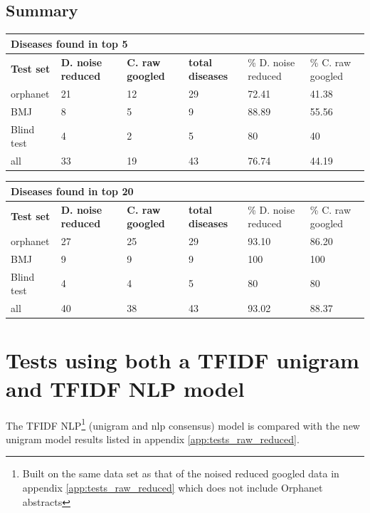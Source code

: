 \documentclass[10pt,letterpaper,two column,final]{article}
\begin{document}
\subsection{Summary}
\label{app:summary_raw_reduced}

\begin{center}
\begin{small}
\begin{tabular}{l|p{2.2cm}p{2.2cm}||p{1.2cm}p{2.2cm}p{2.2cm}}
	\multicolumn{6}{l}{\textbf{Diseases found in top 5}} \\ \hline
\textbf{Test set} & \textbf{D. noise reduced} &	\textbf{C. raw googled}	 &	\textbf{total diseases} &	\% D. noise reduced	 &\% C. raw googled \\ \hline
orphanet    &    21   &  12    & 29      & 72.41     & 41.38 \\
BMJ	        &    8   &   5   &    9   &  88.89    & 55.56 \\
Blind test	&   4    &   2   &    5   &   80   & 40 \\ \hline \hline
all	        &   33    &   19   &   43    &  76.74    & 44.19 \\ \hline
\end{tabular}
\end{small}
\end{center}

\begin{center}
\begin{small}
\begin{tabular}{l|p{2.2cm}p{2.2cm}||p{1.2cm}p{2.2cm}p{2.2cm}}
	\multicolumn{6}{l}{\textbf{Diseases found in top 20}} \\ \hline
\textbf{Test set} & \textbf{D. noise reduced} &	\textbf{C. raw googled}	 &	\textbf{total diseases} &	\% D. noise reduced	 &\% C. raw googled \\ \hline
orphanet    &    27   &   25   &  29     &  93.10    & 86.20\\
BMJ	        &     9  &   9   &    9   &    100  & 100 \\
Blind test	&     4  &   4   &    5   &    80  & 80 \\ \hline \hline
all	        &    40   & 38    &   43    &   93.02   &  88.37 \\ \hline
\end{tabular}
\end{small}
\end{center}


\newpage
\section{Tests using both a TFIDF unigram and TFIDF NLP model}
\label{app:tfidf_tfidfrecalc}
The TFIDF NLP\footnote{Built on the same data set as that of the noised reduced googled data in appendix \ref{app:tests_raw_reduced} which does not include Orphanet abstracts} (unigram and nlp consensus) model is compared with the new
unigram model results listed in appendix \ref{app:tests_raw_reduced}.
\end{document}
